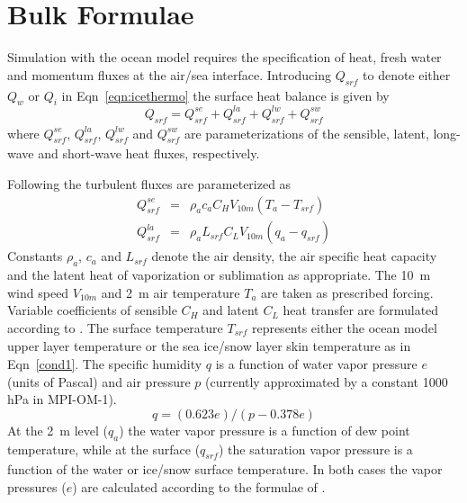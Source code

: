 
\section{Bulk Formulae}
\label{sec:bulkformule}
Simulation with the ocean model requires the specification of heat,
fresh water and momentum fluxes at the air/sea interface. 
Introducing $Q_{\mathit{srf}}$ to denote either $Q_{w}$ or $Q_{i}$ in Eqn~\ref{eqn:icethermo}
the surface heat balance is given by
\begin{equation}
\label{eqn:icethermo1}
Q_{\mathit{srf}} = Q_{\mathit{srf}}^{\mathit{se}} + Q_{\mathit{srf}}^{\mathit{la}}
+                  Q_{\mathit{srf}}^{\mathit{lw}} + Q_{\mathit{srf}}^{\mathit{sw}}
\end{equation}
where $Q_{\mathit{srf}}^{\mathit{se}}$, $Q_{\mathit{srf}}^{\mathit{la}}$,
$Q_{\mathit{srf}}^{\mathit{lw}}$ and $Q_{\mathit{srf}}^{\mathit{sw}}$
are parameterizations of the sensible, latent, long-wave and short-wave heat fluxes, respectively.

Following \citet{oberhuber93} the turbulent fluxes are parameterized as
\begin{eqnarray}
%
%
\label{se}  Q_{\mathit{srf}}^{\mathit{se}}             &=&
\rho_{a}c_{a}C_{H}V_{\mathit{10m}}(T_{a} - T_{\mathit{srf}})            \\
%
%
\label{la} Q_{\mathit{srf}}^{\mathit{la}}              &=&
\rho_{a}L_{\mathit{srf}}C_{L}V_{\mathit{10m}}(q_a - q_{\mathit{srf}})
\end{eqnarray}
Constants $\rho_a$, $c_a$ and $L_{\mathit{srf}}$ denote the air density,
the air specific heat capacity and the latent heat of vaporization or sublimation as appropriate.
The 10~m wind speed $V_{\mathit{10m}}$ and 2~m air temperature $T_{a}$ are taken as prescribed forcing.
Variable coefficients of sensible $C_H$ and latent $C_L$ heat transfer 
are formulated according to \citet{large82}.
The surface temperature $T_{\mathit{srf}}$ represents either the ocean model upper layer temperature
or the sea ice/snow layer skin temperature as in Eqn~\ref{cond1}.
The specific humidity $q$ is a function of water vapor pressure $e$ (units of Pascal)
and air pressure $p$ (currently approximated by a constant 1000 hPa in MPI-OM-1).
\begin{equation}
q = (0.623e)/(p-0.378e)
\end{equation}
At the 2~m level ($q_a$) the water vapor pressure is a function of dew point temperature,
while at the surface ($q_{\mathit{srf}}$) the saturation vapor pressure 
is a function of the water or ice/snow surface temperature.
In both cases the vapor pressures ($e$) are calculated according to the formulae of \citet{buck81}.
 
